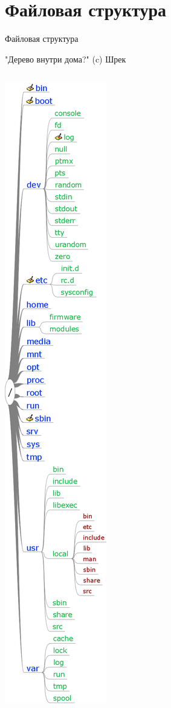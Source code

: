 \documentclass[ignorenonframetext, professionalfonts, hyperref={pdftex, unicode}]{beamer}
\begin{document}
\section*{Файловая структура}

\begin{frame}{Файловая структура}
	
	{\center "Дерево внутри дома?" (c) Шрек}
		
	\begin{columns}
		\includegraphics[height=0.8\textheight]{01-lhs.png}

\end{columns}
\end{frame}
\end{document}
